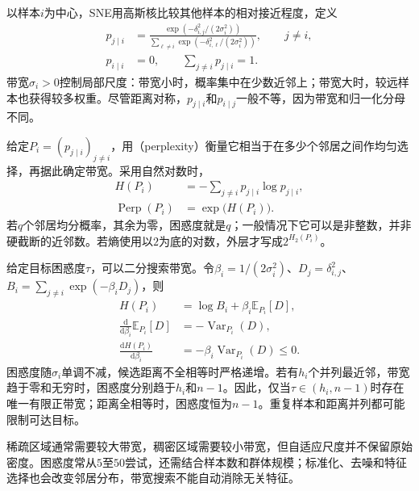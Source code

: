 以样本$i$为中心，SNE用高斯核比较其他样本的相对接近程度，定义
\begin{equation}
  \label{eq:dim-sne-high}
  \begin{aligned}
    p_{j\mid i}
      &=\frac{\exp(-\delta_{i,j}^2/(2\sigma_i^2))}
      {\sum_{\ell\ne i}\exp(-\delta_{i,\ell}^2/(2\sigma_i^2))},
      \qquad j\ne i,\\
    p_{i\mid i}&=0,\qquad \sum_{j\ne i}p_{j\mid i}=1.
  \end{aligned}
\end{equation}
带宽$\sigma_i>0$控制局部尺度：带宽小时，概率集中在少数近邻上；带宽大时，较远样本也获得较多权重。尽管距离对称，$p_{j\mid i}$和$p_{i\mid j}$一般不等，因为带宽和归一化分母不同。

给定$P_i=(p_{j\mid i})_{j\ne i}$，用（perplexity）衡量它相当于在多少个邻居之间作均匀选择，再据此确定带宽。采用自然对数时，
\begin{equation}
  \label{eq:dim-sne-perplexity}
  \begin{aligned}
    H(P_i)&=-\sum_{j\ne i}p_{j\mid i}\log p_{j\mid i},\\
    \operatorname{Perp}(P_i)&=\exp\!\bigl(H(P_i)\bigr).
  \end{aligned}
\end{equation}
若$q$个邻居均分概率，其余为零，困惑度就是$q$；一般情况下它可以是非整数，并非硬截断的近邻数。若熵使用以$2$为底的对数，外层才写成$2^{H_2(P_i)}$。

给定目标困惑度$\tau$，可以二分搜索带宽。令$\beta_i=1/(2\sigma_i^2)$、$D_j=\delta_{i,j}^2$、$B_i=\sum_{j\ne i}\exp(-\beta_iD_j)$，则
\begin{equation}
  \label{eq:dim-sne-entropy-monotonicity}
  \begin{aligned}
    H(P_i)&=\log B_i+\beta_i\mathbb{E}_{P_i}[D],\\
    \frac{\mathrm{d}}{\mathrm{d}\beta_i}\mathbb{E}_{P_i}[D]
      &=-\operatorname{Var}_{P_i}(D),\\
    \frac{\mathrm{d}H(P_i)}{\mathrm{d}\beta_i}
      &=-\beta_i\operatorname{Var}_{P_i}(D)\leq 0.
  \end{aligned}
\end{equation}
困惑度随$\sigma_i$单调不减，候选距离不全相等时严格递增。若有$h_i$个并列最近邻，带宽趋于零和无穷时，困惑度分别趋于$h_i$和$n-1$。因此，仅当$\tau\in(h_i,n-1)$时存在唯一有限正带宽；距离全相等时，困惑度恒为$n-1$。重复样本和距离并列都可能限制可达目标。

稀疏区域通常需要较大带宽，稠密区域需要较小带宽，但自适应尺度并不保留原始密度。困惑度常从$5$至$50$尝试，还需结合样本数和群体规模；标准化、去噪和特征选择也会改变邻居分布，带宽搜索不能自动消除无关特征。

